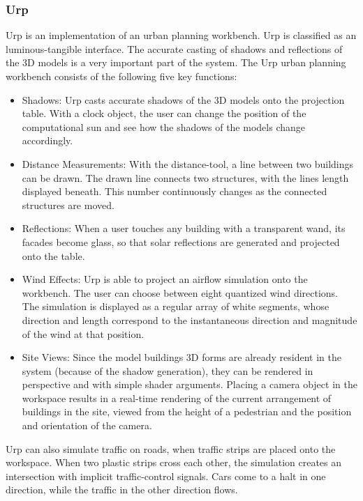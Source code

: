 \subsubsection{Urp}
Urp is an implementation of an urban planning workbench. Urp is classified as an luminous-tangible interface. The accurate casting of shadows and reflections of the 3D models is a very important part of the system. The Urp urban planning workbench consists of the following five key functions:
\begin{itemize}
\item Shadows: Urp casts accurate shadows of the 3D models onto the projection table. With a clock object, the user can change the position of the computational sun and see how the shadows of the models change accordingly. 
\item Distance Measurements: With the distance-tool, a line between two buildings can be drawn. The drawn line connects two structures, with the lines length displayed beneath. This number continuously changes as the connected structures are moved. 
\item Reflections: When a user touches any building with a transparent wand, its facades become glass, so that solar reflections are generated and projected onto the table. 
\item Wind Effects: Urp is able to project an airflow simulation onto the workbench. The user can choose between eight quantized wind directions. The simulation is displayed as a regular array of white segments, whose direction and length correspond to the instantaneous direction and magnitude of the wind at that position.
\item Site Views: Since the model buildings 3D forms are already resident in the system (because of the shadow generation), they can be rendered in perspective and with simple shader arguments. Placing a camera object in the workspace results in a real-time rendering of the current arrangement of buildings in the site, viewed from the height of a pedestrian and the position and orientation of the camera. 
\end{itemize}
Urp can also simulate traffic on roads, when traffic strips are placed onto the workspace. When two plastic strips cross each other, the simulation creates an intersection with implicit traffic-control signals. Cars come to a halt in one direction, while the traffic in the other direction flows. 

